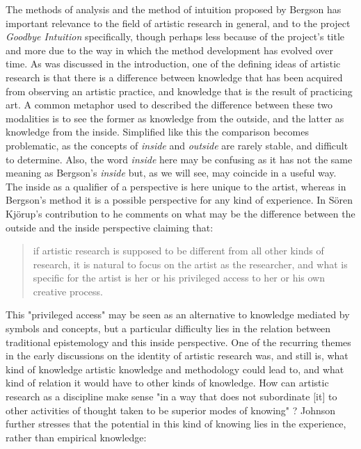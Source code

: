 \documentclass[11pt]{article}
\begin{document}
The methods of analysis and the method of intuition proposed by Bergson has important relevance to the field of artistic research in general, and to the project \emph{Goodbye Intuition} specifically, though perhaps less because of the project's title and more due to the way in which the method development has evolved over time. As was discussed in the introduction, one of the defining ideas of artistic research is that there is a difference between knowledge that has been acquired from observing an artistic practice, and knowledge that is the result of practicing art. A common metaphor used to described the difference between these two modalities is to see the former as knowledge from the outside, and the latter as knowledge from the inside. Simplified like this the comparison becomes problematic, as the concepts of \emph{inside} and \emph{outside} are rarely stable, and difficult to determine. Also, the word \emph{inside} here may be confusing as it has not the same meaning as Bergson's \emph{inside} but, as we will see, may coincide in a useful way. The inside as a qualifier of a perspective is here unique to the artist, whereas in Bergson's method it is a possible perspective for any kind of experience. In Sören Kjörup's contribution to  he comments on what may be the difference between the outside and the inside perspective claiming that:

\begin{quote}
if artistic research is supposed to be different from all other kinds of research, it is natural to focus on the artist as the researcher, and what is specific for the artist is her or his privileged access to her or his own creative process. \citep[p. 25]{kjorup10}
\end{quote}

This "privileged access" may be seen as an alternative to knowledge mediated by symbols and concepts, but a particular difficulty lies in the relation between traditional epistemology and this inside perspective. One of the recurring themes in the early discussions on the identity of artistic research was, and still is, what kind of knowledge artistic knowledge and methodology could lead to, and what kind of relation it would have to other kinds of knowledge. How can artistic research as a discipline make sense "in a way that does not subordinate [it] to other activities of thought taken to be superior modes of knowing" \citep[p. 150]{johnson2010}? Johnson further stresses that the potential in this kind of knowing lies in the experience, rather than empirical knowledge:
\end{document}
